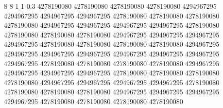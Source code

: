 8 8 1 1 0.3
4278190080 4278190080 4278190080 4278190080 4294967295 4294967295 4294967295 4294967295 4278190080 4278190080 4278190080 4278190080 4294967295 4294967295 4294967295 4294967295 4278190080 4278190080 4278190080 4278190080 4294967295 4294967295 4294967295 4294967295 4278190080 4278190080 4278190080 4278190080 4294967295 4294967295 4294967295 4294967295 4294967295 4294967295 4294967295 4294967295 4278190080 4278190080 4278190080 4278190080 4294967295 4294967295 4294967295 4294967295 4278190080 4278190080 4278190080 4278190080 4294967295 4294967295 4294967295 4294967295 4278190080 4278190080 4278190080 4278190080 4294967295 4294967295 4294967295 4294967295 4278190080 4278190080 4278190080 4278190080
